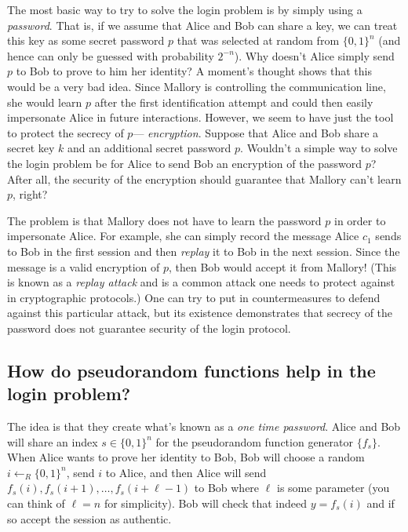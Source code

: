The most basic way to try to solve the login problem is by simply using
a \emph{password}. That is, if we assume that Alice and Bob can share a
key, we can treat this key as some secret password \(p\) that was
selected at random from \(\{0,1\}^n\) (and hence can only be guessed
with probability \(2^{-n}\)). Why doesn't Alice simply send \(p\) to Bob
to prove to him her identity? A moment's thought shows that this would
be a very bad idea. Since Mallory is controlling the communication line,
she would learn \(p\) after the first identification attempt and could
then easily impersonate Alice in future interactions. However, we seem
to have just the tool to protect the secrecy of \(p\)---
\emph{encryption}. Suppose that Alice and Bob share a secret key \(k\)
and an additional secret password \(p\). Wouldn't a simple way to solve
the login problem be for Alice to send Bob an encryption of the password
\(p\)? After all, the security of the encryption should guarantee that
Mallory can't learn \(p\), right?


The problem is that Mallory does not have to learn the password \(p\) in
order to impersonate Alice. For example, she can simply record the
message Alice \(c_1\) sends to Bob in the first session and then
\emph{replay} it to Bob in the next session. Since the message is a
valid encryption of \(p\), then Bob would accept it from Mallory! (This
is known as a \emph{replay attack} and is a common attack one needs to
protect against in cryptographic protocols.) One can try to put in
countermeasures to defend against this particular attack, but its
existence demonstrates that secrecy of the password does not guarantee
security of the login protocol.

\subsection{How do pseudorandom functions help in the login
problem?}\label{4-How-do-pseudorandom-fu}

The idea is that they create what's known as a \emph{one time password}.
Alice and Bob will share an index \(s\in\{0,1\}^n\) for the pseudorandom
function generator \(\{ f_s \}\). When Alice wants to prove her identity
to Bob, Bob will choose a random \(i\leftarrow_R\{0,1\}^n\), send \(i\)
to Alice, and then Alice will send
\(f_s(i),f_s(i+1),\ldots,f_s(i+\ell-1)\) to Bob where \(\ell\) is some
parameter (you can think of \(\ell=n\) for simplicity). Bob will check
that indeed \(y=f_s(i)\) and if so accept the session as authentic.


